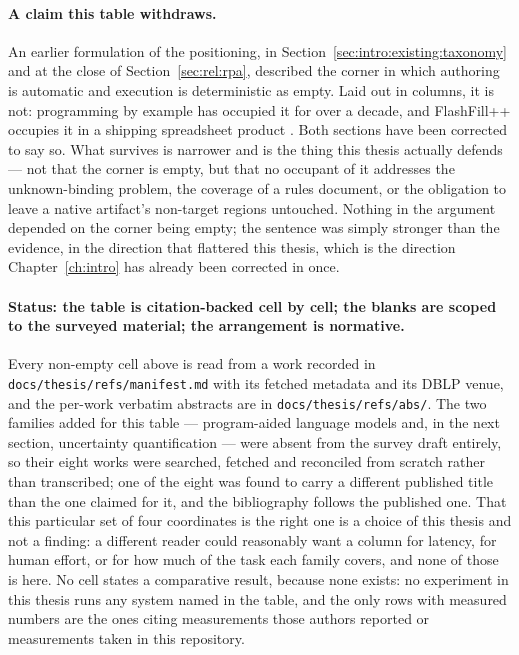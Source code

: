 \paragraph{A claim this table withdraws.}
An earlier formulation of the positioning, in Section~\ref{sec:intro:existing:taxonomy} and at
the close of Section~\ref{sec:rel:rpa}, described the corner in which authoring is automatic
and execution is deterministic as empty. Laid out in columns, it is not: programming by example
has occupied it for over a decade, and FlashFill++ occupies it in a shipping spreadsheet
product \cite{cambronero2023flashfillpp}. Both sections have been corrected to say so. What
survives is narrower and is the thing this thesis actually defends --- not that the corner is
empty, but that no occupant of it addresses the unknown-binding problem, the coverage of a
rules document, or the obligation to leave a native artifact's non-target regions untouched.
Nothing in the argument depended on the corner being empty; the sentence was simply stronger
than the evidence, in the direction that flattered this thesis, which is the direction
Chapter~\ref{ch:intro} has already been corrected in once.

\paragraph{Status: the table is citation-backed cell by cell; the blanks are scoped to the
surveyed material; the arrangement is normative.}
Every non-empty cell above is read from a work recorded in
\texttt{docs/thesis/refs/manifest.md} with its fetched metadata and its DBLP venue, and the
per-work verbatim abstracts are in \texttt{docs/thesis/refs/abs/}. The two families added for
this table --- program-aided language models and, in the next section, uncertainty
quantification --- were absent from the survey draft entirely, so their eight works were
searched, fetched and reconciled from scratch rather than transcribed; one of the eight was
found to carry a different published title than the one claimed for it, and the bibliography
follows the published one. That this particular set of four coordinates is the right one is a
choice of this thesis and not a finding: a different reader could reasonably want a column for
latency, for human effort, or for how much of the task each family covers, and none of those
is here. No cell states a comparative result, because none exists: no experiment in this
thesis runs any system named in the table, and the only rows with measured numbers are the
ones citing measurements those authors reported or measurements taken in this repository.

